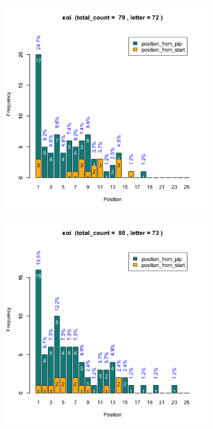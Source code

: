 \documentclass[a4paper]{article}
\begin{document}
\begin{figure}
\begin{subfigure}{0.45\textwidth}
\centering
\includegraphics[width=1\linewidth]{../../data/output/paul_R_par/plots/par3_lt72.png}
\end{subfigure}
\begin{subfigure}{0.45\textwidth}
\centering
\includegraphics[width=1\linewidth]{../../data/output/paul_R_par/plots/par3_lt73.png}

\end{subfigure}
\end{figure}
\end{document}
